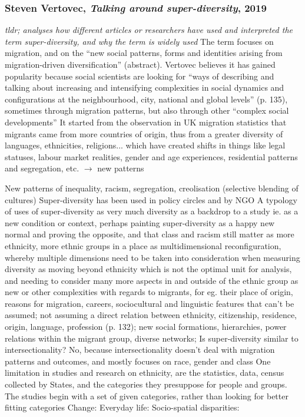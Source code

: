\documentclass{article}
\newcommand{\alignedmarginpar}[1]{%
        \marginpar{\raggedright\small #1}
    }
\begin{document}
\subsubsection{Steven Vertovec, \textit{Talking around super-diversity}, 2019}

\begin{outline}
	\1 \textit{tldr; analyses how different articles or researchers have used and interpreted the term super-diversity, and why the term is widely used}
	\1 The term focuses on migration, and on the ``new social patterns, forms and identities arising from migration-driven diversification'' (abstract). Vertovec believes it has gained popularity because social scientists are looking for ``ways of describing and talking about increasing and intensifying complexities in social dynamics and configurations at the neighbourhood, city, national and global levels'' (p. 135), sometimes through migration patterns, but also through other ``complex social developments''
		\2 It started from the observation in UK migration statistics that migrants came from more countries of origin, thus from a greater diversity of languages, ethnicities, religions... which have created shifts in things like legal statuses, labour market realities, gender and age experiences, residential patterns and segregation, etc. $\rightarrow$ new patterns\alignedmarginpar{change, socio-spatial disparities, everyday life}
		\2 New patterns of inequality, racism, segregation, creolisation (selective blending of cultures)
	\1 Super-diversity has been used in policy circles and by NGO
	\1 A typology of uses of super-diversity 
		\2 as very much diversity
		\2 as a backdrop to a study ie. as a new condition or context, perhaps painting super-diversity as a happy new normal and proving the opposite, and that class and racism still matter
		\2 as more ethnicity, more ethnic groups in a place
		\2 as multidimensional reconfiguration, whereby multiple dimensions need to be taken into consideration when measuring diversity
		\2 as moving beyond ethnicity which is not the optimal unit for analysis, and needing to consider many more aspects in and outside of the ethnic group
		\2 as new or other complexities with regards to migrants, for eg. their place of origin, reasons for migration, careers, sociocultural and linguistic features that can't be assumed; not assuming a direct relation between ethnicity, citizenship, residence, origin, language, profession (p. 132); new social formations, hierarchies, power relations within the migrant group, diverse networks;
	\1 Is super-diversity similar to intersectionality? No, because intersectionality doesn't deal with migration patterns and outcomes, and mostly focuses on race, gender and class
	\1 One limitation in studies and research on ethnicity, are the statistics, data, census collected by States, and the categories they presuppose for people and groups. The studies begin with a set of given categories, rather than looking for better fitting categories
	\1 Change:
	\1 Everyday life:
	\1 Socio-spatial disparities:
\end{outline}
\end{document}
